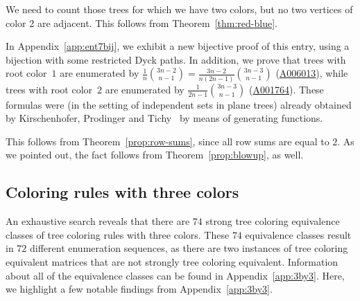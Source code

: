 \documentclass[12pt]{amsart}
\newcommand{\seqnum}[1]{\href{https://oeis.org/#1}{#1}}
\begin{document}
\begin{description}
\vspace{1mm}
\item[Entry 7] We need to count those trees for which we have two colors, but no two vertices of color 2 are adjacent. 
This follows from Theorem~\ref{thm:red-blue}.

In Appendix~\ref{app:ent7bij}, we exhibit a new bijective proof of this entry, using a bijection with some restricted Dyck paths. In addition, we prove that trees with root color~$1$ are enumerated by $\frac{1}{n}\binom{3n-2}{n-1}=\frac{3n-2}{n(2n-1)}\binom{3n-3}{n-1}$ (\seqnum{A006013}), while trees with root color~$2$ are enumerated by $\frac{1}{2n-1}\binom{3n-3}{n-1}$ (\seqnum{A001764}). These formulas were (in the setting of independent sets in plane trees) already obtained by Kirschenhofer, Prodinger and Tichy~\cite{KPT1986Fibonacci} by means of generating functions.
\vspace{1mm}
\item[Entry 8] This follows from Theorem~\ref{prop:row-sums}, since all row sums are equal to $2$. As we pointed out, the fact follows from Theorem~\ref{prop:blowup}, as well.
\end{description}




\subsection{Coloring rules with three colors}\label{ss:3by3}
An exhaustive search reveals that there are $74$ strong tree coloring equivalence classes of tree coloring rules with three colors. 
These $74$ equivalence classes result in $72$ different enumeration sequences, as there are two instances of tree coloring equivalent matrices that are not strongly tree coloring equivalent.
Information about all of the equivalence classes can be found in Appendix~\ref{app:3by3}. 
Here, we highlight a few notable findings from Appendix~\ref{app:3by3}.
\end{document}
